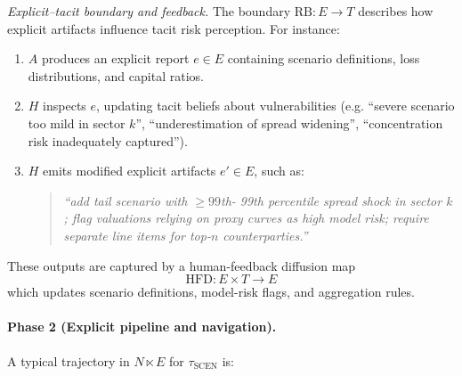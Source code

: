 \emph{Explicit--tacit boundary and feedback.}
The boundary \(\mathrm{RB}: E \to T\) describes how explicit artifacts influence tacit risk perception. For instance:
\begin{enumerate}
  \item \(A\) produces an explicit report \(e \in E\) containing scenario definitions, loss distributions, and capital ratios.
  \item \(H\) inspects \(e\), updating tacit beliefs about vulnerabilities (e.g. ``severe scenario too mild in sector \(k\)'', ``underestimation of spread widening'', ``concentration risk inadequately captured'').
  \item \(H\) emits modified explicit artifacts \(e' \in E\), such as:
  \begin{quote}
    \emph{``add tail scenario with $\geq 99$th- 99th percentile spread shock in sector \(k\); flag valuations relying on proxy curves as high model risk; require separate line items for top-\(n\) counterparties.''}
  \end{quote}
\end{enumerate}
These outputs are captured by a human-feedback diffusion map
\[
  \mathrm{HFD}: E \times T \to E
\]
which updates scenario definitions, model-risk flags, and aggregation rules.

\paragraph{Phase 2 (Explicit pipeline and navigation).}
A typical trajectory in \(N \ltimes E\) for \(\tau_{\mathrm{SCEN}}\) is:

